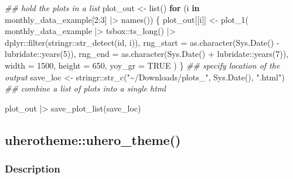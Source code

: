 \documentclass[
  letterpaper,
  DIV=11,
  numbers=noendperiod]{scrreport}
\newenvironment{Shaded}{\begin{snugshade}}{\end{snugshade}}
\newcommand{\AttributeTok}[1]{\textcolor[rgb]{0.40,0.45,0.13}{#1}}
\newcommand{\ConstantTok}[1]{\textcolor[rgb]{0.56,0.35,0.01}{#1}}
\newcommand{\ControlFlowTok}[1]{\textcolor[rgb]{0.00,0.23,0.31}{\textbf{#1}}}
\newcommand{\DecValTok}[1]{\textcolor[rgb]{0.68,0.00,0.00}{#1}}
\newcommand{\DocumentationTok}[1]{\textcolor[rgb]{0.37,0.37,0.37}{\textit{#1}}}
\newcommand{\FunctionTok}[1]{\textcolor[rgb]{0.28,0.35,0.67}{#1}}
\newcommand{\NormalTok}[1]{\textcolor[rgb]{0.00,0.23,0.31}{#1}}
\newcommand{\OtherTok}[1]{\textcolor[rgb]{0.00,0.23,0.31}{#1}}
\newcommand{\SpecialCharTok}[1]{\textcolor[rgb]{0.37,0.37,0.37}{#1}}
\newcommand{\StringTok}[1]{\textcolor[rgb]{0.13,0.47,0.30}{#1}}
\begin{document}
\begin{Shaded}
\begin{Highlighting}[]
\DocumentationTok{\#\# hold the plots in a list}
\NormalTok{plot\_out }\OtherTok{\textless{}{-}} \FunctionTok{list}\NormalTok{()}
\ControlFlowTok{for}\NormalTok{ (i }\ControlFlowTok{in}\NormalTok{ monthly\_data\_example[}\DecValTok{2}\SpecialCharTok{:}\DecValTok{3}\NormalTok{] }\SpecialCharTok{|\textgreater{}} \FunctionTok{names}\NormalTok{()) \{}
\NormalTok{  plot\_out[[i]] }\OtherTok{\textless{}{-}} \FunctionTok{plot\_1}\NormalTok{(}
\NormalTok{    monthly\_data\_example }\SpecialCharTok{|\textgreater{}}\NormalTok{ tsbox}\SpecialCharTok{::}\FunctionTok{ts\_long}\NormalTok{() }\SpecialCharTok{|\textgreater{}}
\NormalTok{      dplyr}\SpecialCharTok{::}\FunctionTok{filter}\NormalTok{(stringr}\SpecialCharTok{::}\FunctionTok{str\_detect}\NormalTok{(id, i)),}
    \AttributeTok{rng\_start =} \FunctionTok{as.character}\NormalTok{(}\FunctionTok{Sys.Date}\NormalTok{() }\SpecialCharTok{{-}}\NormalTok{ lubridate}\SpecialCharTok{::}\FunctionTok{years}\NormalTok{(}\DecValTok{5}\NormalTok{)),}
    \AttributeTok{rng\_end =} \FunctionTok{as.character}\NormalTok{(}\FunctionTok{Sys.Date}\NormalTok{() }\SpecialCharTok{+}\NormalTok{ lubridate}\SpecialCharTok{::}\FunctionTok{years}\NormalTok{(}\DecValTok{7}\NormalTok{)),}
    \AttributeTok{width =} \DecValTok{1500}\NormalTok{, }\AttributeTok{height =} \DecValTok{650}\NormalTok{, }\AttributeTok{yoy\_gr =} \ConstantTok{TRUE}
\NormalTok{  )}
\NormalTok{\}}
\DocumentationTok{\#\# specify location of the output}
\NormalTok{save\_loc }\OtherTok{\textless{}{-}}\NormalTok{ stringr}\SpecialCharTok{::}\FunctionTok{str\_c}\NormalTok{(}\StringTok{"\textasciitilde{}/Downloads/plots\_"}\NormalTok{, }\FunctionTok{Sys.Date}\NormalTok{(), }\StringTok{".html"}\NormalTok{)}
\DocumentationTok{\#\# combine a list of plots into a single html}

\NormalTok{plot\_out }\SpecialCharTok{|\textgreater{}} \FunctionTok{save\_plot\_list}\NormalTok{(save\_loc)}
\end{Highlighting}
\end{Shaded}

\subsection{uherotheme::uhero\_theme()}\label{uherothemeuhero_theme}

\subsubsection{Description}\label{description-69}
\end{document}
